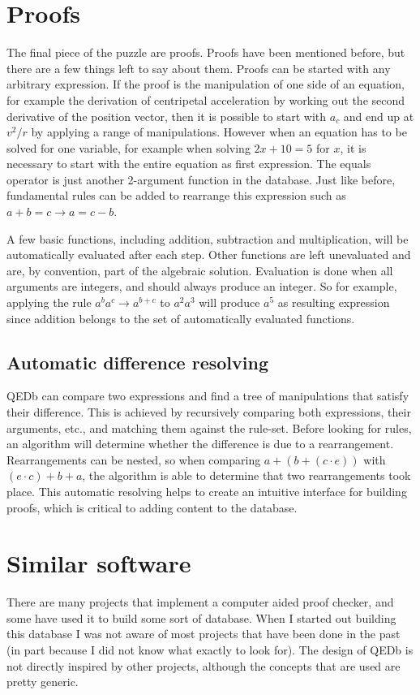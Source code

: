 \documentclass{article}
\begin{document}
\section{Proofs}
The final piece of the puzzle are proofs. Proofs have been mentioned before, but there are a few things left to say about them. Proofs can be started with any arbitrary expression. If the proof is the manipulation of one side of an equation, for example the derivation of centripetal acceleration by working out the second derivative of the position vector, then it is possible to start with $a_c$ and end up at $v^2/r$ by applying a range of manipulations. However when an equation has to be solved for one variable, for example when solving $2x+10=5$ for $x$, it is necessary to start with the entire equation as first expression. The equals operator is just another 2-argument function in the database. Just like before, fundamental rules can be added to rearrange this expression such as $a+b=c\rightarrow a=c-b$. \par
A few basic functions, including addition, subtraction and multiplication, will be automatically evaluated after each step. Other functions are left unevaluated and are, by convention, part of the algebraic solution. Evaluation is done when all arguments are integers, and should always produce an integer. So for example, applying the rule $a^ba^c\rightarrow a^{b+c}$ to $a^2a^3$ will produce $a^5$ as resulting expression since addition belongs to the set of automatically evaluated functions.

\subsection{Automatic difference resolving}
\label{section:difference-resolving}
QEDb can compare two expressions and find a tree of manipulations that satisfy their difference. This is achieved by recursively comparing both expressions, their arguments, etc., and matching them against the rule-set. Before looking for rules, an algorithm will determine whether the difference is due to a rearrangement. Rearrangements can be nested, so when comparing $a+(b+(c\cdot e))$ with $(e\cdot c)+b+a$, the algorithm is able to determine that two rearrangements took place. This automatic resolving helps to create an intuitive interface for building proofs, which is critical to adding content to the database.

\newpage

\section{Similar software}
There are many projects that implement a computer aided proof checker, and some have used it to build some sort of database. When I started out building this database I was not aware of most projects that have been done in the past (in part because I did not know what exactly to look for). The design of QEDb is not directly inspired by other projects, although the concepts that are used are pretty generic.
\end{document}
